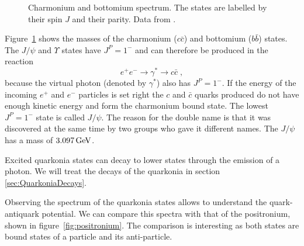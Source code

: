 \documentclass[12pt]{article}
\begin{document}
\begin{figure}
\begin{center}
\end{center}
\caption{Charmonium and bottomium spectrum. The states are labelled by their spin $J$ and their parity. Data from \cite{pdg}.}\label{fig:charmonium}
 \end{figure}

Figure~\ref{fig:charmonium} shows the masses of the charmonium ($c\bar c$) and bottomium ($b\bar b$) states. The $J/\psi$ and $\Upsilon$ states have $J^P=1^{-}$ and can therefore be produced in the reaction
\[e^+e^-\rightarrow \gamma^*\rightarrow c\bar c\;,\]
because the virtual photon (denoted by $\gamma^*$) also has $J^P=1^-$. If the energy of the incoming $e^+$ and $e^-$ particles is set right the $c$ and $\bar c$ quarks produced do not have enough kinetic energy and form the charmonium bound state. The lowest $J^P=1^-$ state is called $J/\psi$. The reason for the double name is that it was discovered at the same time by two groups who gave it different names. The $J/\psi$ has a mass of $3.097\,{\rm GeV}$. 

Excited quarkonia states can decay to lower states through the emission of a photon. We will treat the decays of the quarkonia in section \ref{sec:QuarkoniaDecays}. 

Observing the spectrum of the quarkonia states allows to understand the quark-antiquark potential. We can compare this spectra with that of the positronium, shown in figure~\ref{fig:positronium}. The comparison is interesting as both states are bound states of a particle and its anti-particle.   
\end{document}
